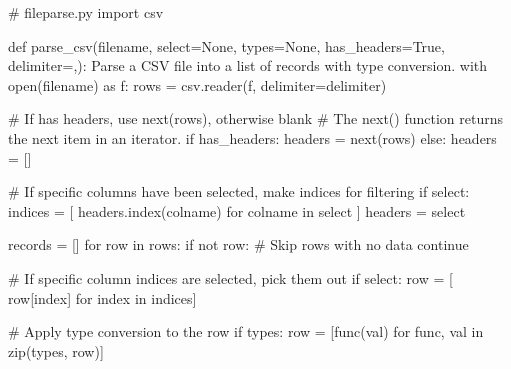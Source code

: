 \documentclass[
  letterpaper,
  DIV=11,
  numbers=noendperiod]{scrreprt}
\newenvironment{Shaded}{\begin{snugshade}}{\end{snugshade}}
\newcommand{\BuiltInTok}[1]{\textcolor[rgb]{0.00,0.46,0.62}{#1}}
\newcommand{\CommentTok}[1]{\textcolor[rgb]{0.37,0.37,0.37}{#1}}
\newcommand{\ControlFlowTok}[1]{\textcolor[rgb]{0.00,0.46,0.62}{#1}}
\newcommand{\ImportTok}[1]{\textcolor[rgb]{0.00,0.46,0.62}{#1}}
\newcommand{\KeywordTok}[1]{\textcolor[rgb]{0.00,0.46,0.62}{#1}}
\newcommand{\NormalTok}[1]{\textcolor[rgb]{0.00,0.46,0.62}{#1}}
\newcommand{\OperatorTok}[1]{\textcolor[rgb]{0.37,0.37,0.37}{#1}}
\newcommand{\StringTok}[1]{\textcolor[rgb]{0.13,0.47,0.30}{#1}}
\newcommand{\VariableTok}[1]{\textcolor[rgb]{0.07,0.07,0.07}{#1}}
\begin{document}
\begin{Shaded}
\begin{Highlighting}[]
\CommentTok{\# fileparse.py}
\ImportTok{import}\NormalTok{ csv}

\KeywordTok{def}\NormalTok{ parse\_csv(filename, select}\OperatorTok{=}\VariableTok{None}\NormalTok{, types}\OperatorTok{=}\VariableTok{None}\NormalTok{, has\_headers}\OperatorTok{=}\VariableTok{True}\NormalTok{, delimiter}\OperatorTok{=}\StringTok{\textquotesingle{},\textquotesingle{}}\NormalTok{):}
    \CommentTok{\textquotesingle{}\textquotesingle{}\textquotesingle{}}
\CommentTok{    Parse a CSV file into a list of records with type conversion.}
\CommentTok{    \textquotesingle{}\textquotesingle{}\textquotesingle{}}
    \ControlFlowTok{with} \BuiltInTok{open}\NormalTok{(filename) }\ImportTok{as}\NormalTok{ f:}
\NormalTok{        rows }\OperatorTok{=}\NormalTok{ csv.reader(f, delimiter}\OperatorTok{=}\NormalTok{delimiter)}

        \CommentTok{\# If has headers, use next(rows), otherwise blank}
        \CommentTok{\# The next() function returns the next item in an iterator.}
        \ControlFlowTok{if}\NormalTok{ has\_headers:}
\NormalTok{            headers }\OperatorTok{=} \BuiltInTok{next}\NormalTok{(rows)}
        \ControlFlowTok{else}\NormalTok{:}
\NormalTok{            headers }\OperatorTok{=}\NormalTok{ []}

        \CommentTok{\# If specific columns have been selected, make indices for filtering }
        \ControlFlowTok{if}\NormalTok{ select:}
\NormalTok{            indices }\OperatorTok{=}\NormalTok{ [ headers.index(colname) }\ControlFlowTok{for}\NormalTok{ colname }\KeywordTok{in}\NormalTok{ select ]}
\NormalTok{            headers }\OperatorTok{=}\NormalTok{ select}

\NormalTok{        records }\OperatorTok{=}\NormalTok{ []}
        \ControlFlowTok{for}\NormalTok{ row }\KeywordTok{in}\NormalTok{ rows:}
            \ControlFlowTok{if} \KeywordTok{not}\NormalTok{ row:     }\CommentTok{\# Skip rows with no data}
                \ControlFlowTok{continue}

            \CommentTok{\# If specific column indices are selected, pick them out}
            \ControlFlowTok{if}\NormalTok{ select:}
\NormalTok{                row }\OperatorTok{=}\NormalTok{ [ row[index] }\ControlFlowTok{for}\NormalTok{ index }\KeywordTok{in}\NormalTok{ indices]}

            \CommentTok{\# Apply type conversion to the row}
            \ControlFlowTok{if}\NormalTok{ types:}
\NormalTok{                row }\OperatorTok{=}\NormalTok{ [func(val) }\ControlFlowTok{for}\NormalTok{ func, val }\KeywordTok{in} \BuiltInTok{zip}\NormalTok{(types, row)]}


\end{Highlighting}
\end{Shaded}
\end{document}
